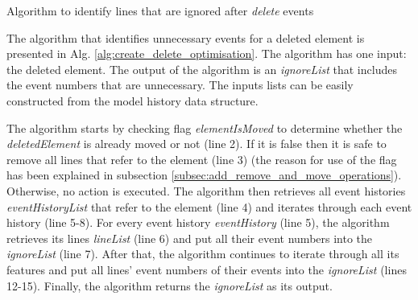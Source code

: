\documentclass{llncs}
\begin{document}
\begin{algorithm}[H]
\begin{small}
\end{small}
\caption{Algorithm to identify lines that are ignored after \emph{delete} events}
\label{alg:create_delete_optimisation}
\end{algorithm}

The algorithm that identifies unnecessary events for a deleted element is presented in Alg. \ref{alg:create_delete_optimisation}.
The algorithm has one input: the deleted element.
The output of the algorithm is an \emph{ignoreList} that includes the event numbers that are unnecessary.
The inputs lists can be easily constructed from the model history data structure.

The algorithm starts by checking flag \emph{elementIsMoved} to determine whether the \emph{deletedElement} is already moved or not (line 2).
If it is false then it is safe to remove all lines that refer to the element (line 3) (the reason for use of the flag has been explained in subsection \ref{subsec:add_remove_and_move_operations}).
Otherwise, no action is executed.
The algorithm then retrieves all event histories \emph{eventHistoryList} that refer to the element (line 4) and iterates through each event history (line 5-8).
For every event history \emph{eventHistory} (line 5), the algorithm retrieves its lines \emph{lineList} (line 6) and put all their event numbers into the \emph{ignoreList} (line 7).
After that, the algorithm continues to iterate through all its features and put all lines' event numbers of their events into the \emph{ignoreList} (lines 12-15). Finally, the algorithm returns the \emph{ignoreList} as its output.
\end{document}
